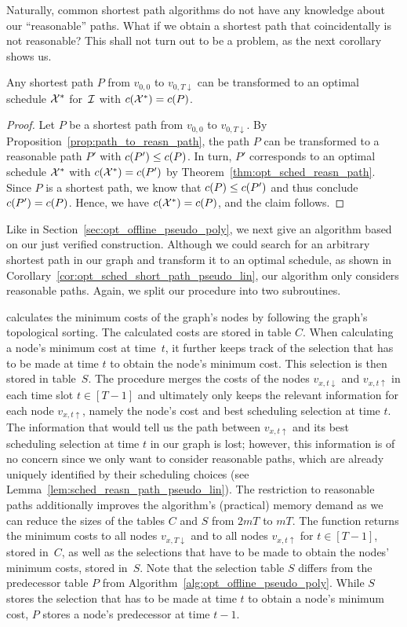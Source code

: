 Naturally, common shortest path algorithms do not have any knowledge about our ``reasonable'' paths. What if we obtain a shortest path that coincidentally is not reasonable? This shall not turn out to be a problem, as the next corollary shows us.
\begin{cor}\label{cor:opt_sched_short_path_pseudo_lin}
Any shortest path $P$ from $v_{0,0}$ to $v_{0,T\downarrow}$ can be transformed to an optimal schedule $\mathcal{X}^*$ for~$\mathcal{I}$ with $c(\mathcal{X}^*)=c(P)$.
\end{cor}
\begin{proof}
Let $P$ be a shortest path from $v_{0,0}$ to $v_{0,T\downarrow}$. By Proposition~\ref{prop:path_to_reasn_path}, the path $P$ can be transformed to a reasonable path $P'$ with $c(P')\le c(P)$.
In turn, $P'$ corresponds to an optimal schedule $\mathcal{X}^*$ with $c(\mathcal{X}^*)=c(P')$ by Theorem~\ref{thm:opt_sched_reasn_path}. Since $P$ is a shortest path, we know that $c(P)\le c(P')$ and thus conclude $c(P')=c(P)$. Hence, we have $c(\mathcal{X}^*)=c(P)$, and the claim follows.
\end{proof}
Like in Section~\ref{sec:opt_offline_pseudo_poly}, we next give an algorithm based on our just verified construction. Although we could search for an arbitrary shortest path in our graph and transform it to an optimal schedule, as shown in Corollary~\ref{cor:opt_sched_short_path_pseudo_lin}, our algorithm only considers reasonable paths. Again, we split our procedure into two subroutines.

 calculates the minimum costs of the graph's nodes by following the graph's topological sorting. The calculated costs are stored in table $C$. When calculating a node's minimum cost at time~$t$, it further keeps track of the selection that has to be made at time $t$ to obtain the node's minimum cost. This selection is then stored in table~$S$. 
The procedure merges the costs of the nodes $v_{x,t\downarrow}$ and $v_{x,t\uparrow}$ in each time slot $t\in[T-1]$ and ultimately only keeps the relevant information for each node $v_{x,t\uparrow}$, namely the node's cost and best scheduling selection at time $t$. The information that would tell us the path between $v_{x,t\uparrow}$ and its best scheduling selection at time $t$ in our graph is lost; however, this information is of no concern since we only want to consider reasonable paths, which are already uniquely identified by their scheduling choices (see Lemma~\ref{lem:sched_reasn_path_pseudo_lin}). The restriction to reasonable paths additionally improves the algorithm's (practical) memory demand as we can reduce the sizes of the tables $C$ and $S$ from $2mT$ to $mT$. 
The function returns the minimum costs to all nodes $v_{x,T\downarrow}$ and to all nodes $v_{x,t\uparrow}$ for $t\in[T-1]$, stored in~$C$, as well as the selections that have to be made to obtain the nodes' minimum costs, stored in~$S$. Note that the selection table $S$ differs from the predecessor table $P$ from Algorithm~\ref{alg:opt_offline_pseudo_poly}. While $S$ stores the selection that has to be made at time $t$ to obtain a node's minimum cost, $P$ stores a node's predecessor at time $t-1$.

